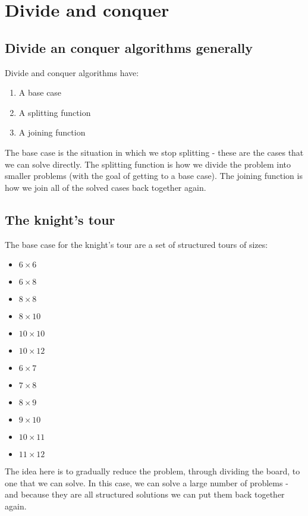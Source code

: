 \documentclass[11pt, a4paper]{article}
\begin{document}
\section{Divide and conquer}

\subsection{Divide an conquer algorithms generally}

Divide and conquer algorithms have:
\begin{enumerate}
\item A base case
\item A splitting function
\item A joining function
\end{enumerate}

The base case is the situation in which we stop splitting - these are the cases that we can solve directly.
The splitting function is how we divide the problem into smaller problems (with the goal of getting to a base case).
The joining function is how we join all of the solved cases back together again.

\subsection{The knight's tour}

The base case for the knight's tour are a set of structured tours of sizes:
\begin{itemize}
\item $6 \times 6$
\item $6 \times 8$
\item $8 \times 8$
\item $8 \times 10$
\item $10 \times 10$
\item $10 \times 12$
\item $6 \times 7$
\item $7 \times 8$
\item $8 \times 9$
\item $9 \times 10$
\item $10 \times 11$
\item $11 \times 12$
\end{itemize}


The idea here is to gradually reduce the problem, through dividing the board, to one that we can solve. In this case, we can solve a large number of problems - and because they are all structured solutions we can put them back together again.
\end{document}
